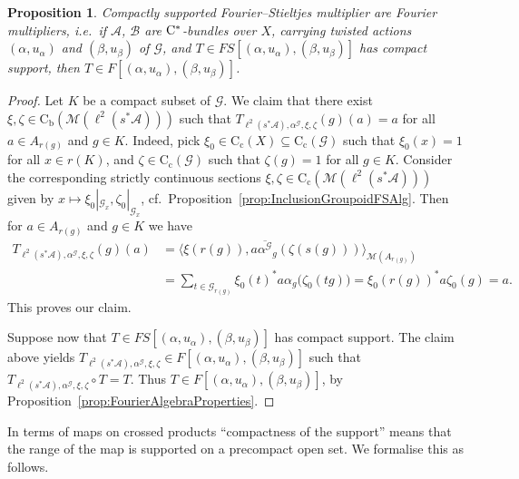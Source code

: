 \documentclass[11 pt, leqno]{amsart}
\numberwithin{equation}{section}
\theoremstyle{plain}
\newtheorem {prop}[thm] {Proposition}
\theoremstyle{definition}
\newcommand*{\contc}{\mathrm{C_c}}%
\newcommand*{\contb}{\mathrm{C_b}}%
\newcommand*{\s}{s} %
\newcommand{\B}{\mathcal B}
\newcommand{\M}{\mathcal M}
\newcommand{\G}{\mathcal G} %
\newcommand{\A}{\mathcal A}
\newcommand{\cst}{\ifmmode\mathrm{C}^*\else{$\mathrm{C}^*$}\fi}
\begin{document}
\begin{prop}\label{prop:compactly_supported}
Compactly supported Fourier--Stieltjes multiplier are Fourier multipliers, i.e.\ if $\A$, $\B$ are $\cst$-bundles over $X$, carrying twisted actions $(\alpha,u_\alpha)$ and $(\beta,u_\beta)$ of $\G$, and $T\in FS[(\alpha,u_{\alpha}),(\beta,u_{\beta})]$ has compact support, then $T\in F[(\alpha,u_{\alpha}),(\beta,u_{\beta})]$.
\end{prop}
\begin{proof}
Let $K$ be a compact subset of $\G$. 
We claim that there exist $\xi , \zeta\in  \contb(\M(\ell^2(s^*\A)))$ such that $T_{\ell^2(s^*\A), \alpha^\G, \xi , \zeta}(g)(a) = a$ for all $a \in A_{r(g)}$ and $g \in K$. 
Indeed, pick $\xi_0 \in \contc(X)\subseteq\contc(\G )$ such that $\xi_0(x) = 1$ for all $x\in r(K)$, and $\zeta\in \contc(\G)$ such that $\zeta(g) = 1$ for all $g \in K$. 
Consider the corresponding strictly continuous sections $\xi, \zeta \in \contc(\M(\ell^2(\s^*\A)))$ given by $x\mapsto \xi_0|_{\G_x}, \zeta_0|_{\G_x}$, cf.\ Proposition~\ref{prop:InclusionGroupoidFSAlg}.
Then for $a \in A_{r(g)}$ and $g \in K$ we have
\[
\begin{split}
    T_{\ell^2(s^*\A) , \alpha^\G , \xi , \zeta}(g)(a) &= \langle \xi (r(g)) , a \overline{\alpha^\G}_g (\zeta(s(g))) \rangle_{\M(A_{r(g)})} \\  
        &= \sum_{t \in \G_{r(g)}} \xi_0(t)^* a \alpha_g \big( \zeta_{0}(t g) \big) = \xi_0(r(g))^* a  \zeta_0(g)=a.
\end{split}
\]
This proves our claim. 

Suppose now that $T\in FS[(\alpha,u_{\alpha}),(\beta,u_{\beta})]$ has compact support. 
The claim above yields $T_{\ell^2(s^*\A), \alpha^\G, \xi , \zeta} \in F[(\alpha,u_{\alpha}),(\beta,u_{\beta})]$ such that $T_{\ell^2(s^*\A), \alpha^\G, \xi , \zeta}\circ T = T$.
Thus $T \in F[(\alpha,u_{\alpha}),(\beta,u_{\beta})]$, by   Proposition~\ref{prop:FourierAlgebraProperties}.
\end{proof}

In terms of maps on crossed products ``compactness of the support'' means that the range of the map is supported on a precompact open set. 
We formalise this as follows. 
\end{document}
